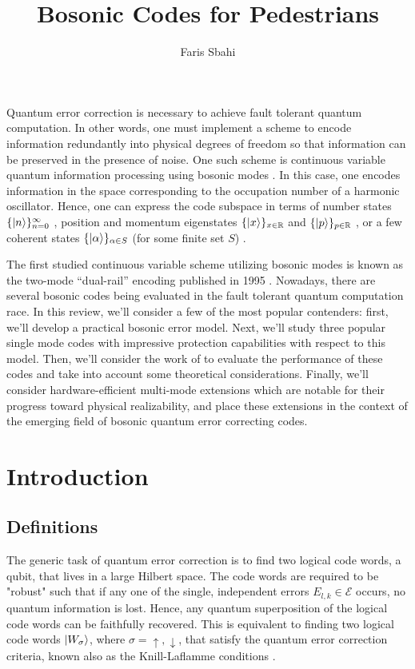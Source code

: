 \documentclass[12]{amsart}
\title{Bosonic Codes for Pedestrians}
\author{Faris Sbahi}
\newcommand\0{\mathbf{0}}
\newcommand\RR{\mathbb{R}}
\newcommand\<{\langle}
\renewcommand\>{\rangle}
\begin{document}
\maketitle

Quantum error correction is necessary to achieve fault tolerant quantum computation. In other words, one must implement a scheme to encode information redundantly into physical degrees of freedom so that information can be preserved in the presence of noise. One such scheme is continuous variable quantum information processing using bosonic modes \cite{braunstein1998error, braunstein2005quantum, niset2008experimentally, aoki2009quantum, lloyd1998analog, lassen2010quantum}. In this case, one encodes information in the space corresponding to the occupation number of a harmonic oscillator. Hence, one can express the code subspace in terms of number states $\{\ket{n}\}^\infty_{n=0}$ \cite{michael2016new}, position and momentum eigenstates $\{\ket{x}\}_{x\in\RR}$ and $\{\ket{p}\}_{p\in\RR}$  \cite{gottesman2001encoding}, or a few coherent states $\{\ket{\alpha}\}_{\alpha\in S}$ (for some finite set $S$) \cite{cochrane1999macroscopically}.

The first studied continuous variable scheme utilizing bosonic modes is known as the two-mode “dual-rail” encoding published in 1995 \cite{chuang1995simple}. Nowadays, there are several bosonic codes being evaluated in the fault tolerant quantum computation race. In this review, we'll consider a few of the most popular contenders: first, we'll develop a practical bosonic error model. Next, we'll study three popular single mode codes with impressive protection capabilities with respect to this model. Then, we'll consider the work of \cite{albert2017performance} to evaluate the performance of these codes and take into account some theoretical considerations. Finally, we'll consider hardware-efficient multi-mode extensions which are notable for their progress toward physical realizability, and place these extensions in the context of the emerging field of bosonic quantum error correcting codes.

\section{Introduction}

\subsection{Definitions}

The generic task of quantum error correction is to find two logical code words, a qubit, that lives in a large Hilbert space. The code words are required to be "robust" such that if any one of the single, independent errors $E_{l,k} \in \mathcal{E}$ occurs, no quantum information is lost. Hence, any quantum superposition of the logical code words can be faithfully recovered. This is equivalent to finding two logical code words $\ket{W_\sigma}$, where $\sigma = \uparrow, \downarrow$, that satisfy the quantum error correction criteria, known also as the Knill-Laflamme conditions \cite{nielsen2002quantum}.
\end{document}

